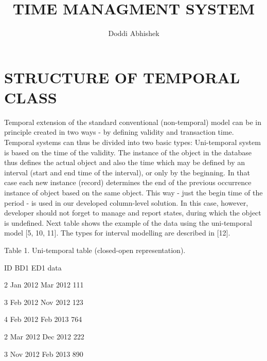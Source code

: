\documentclass{article}
\title{TIME MANAGMENT SYSTEM}
\author{Doddi Abhishek}
\begin{document}
\maketitle





\section{STRUCTURE OF TEMPORAL CLASS}
Temporal extension of the standard conventional (non-temporal) model can be in principle created in two ways - by
defining validity and transaction time. Temporal systems can thus be divided into two basic types:
Uni-temporal system is based on the time of the validity. The instance of the object in the database thus defines the
actual object and also the time which may be defined by an interval (start and end time of the interval), or only by the
beginning. In that case each new instance (record) determines the end of the previous occurrence instance of object
based on the same object. This way - just the begin time of the period - is used in our developed column-level solution.
In this case, however, developer should not forget to manage and report states, during which the object is undefined.
Next table shows the example of the data using the uni-temporal model [5, 10, 11]. The types for interval modelling are
described in [12].
\item Table 1. Uni-temporal table (closed-open representation).
\item  ID BD1 ED1 data
\item2 Jan 2012 Mar 2012 111
\item3 Feb 2012 Nov 2012 123
\item4 Feb 2012 Feb 2013 764
\item2 Mar 2012 Dec 2012 222
\item3 Nov 2012 Feb 2013 890
\end{document}
